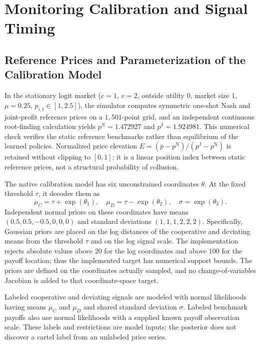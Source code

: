 \section{Monitoring Calibration and Signal Timing}

\subsection{Reference Prices and Parameterization of the Calibration Model}

In the stationary logit market ($c=1$, $v=2$, outside utility $0$, market size $1$, $\mu=0.25$, $p_{i,t}\in[1,2.5]$), the simulator computes symmetric one-shot Nash and joint-profit reference prices on a $1{,}501$-point grid, and an independent continuous root-finding calculation yields $p^{\mathrm{N}} = 1.472927$ and $p^{\mathrm{J}} = 1.924981$. This numerical check verifies the static reference benchmarks rather than equilibrium of the learned policies. Normalized price elevation $E = (\bar{p}-p^{\mathrm{N}})/(p^{\mathrm{J}}-p^{\mathrm{N}})$ is retained without clipping to $[0,1]$; it is a linear position index between static reference prices, not a structural probability of collusion.

The native calibration model has six unconstrained coordinates $\theta$. At the fixed threshold $\tau$, it decodes them as
\[
\mu_C = \tau + \exp(\theta_1), \quad \mu_D = \tau - \exp(\theta_2), \quad \sigma = \exp(\theta_3).
\]
Independent normal priors on these coordinates have means $(0.5, 0.5, -0.5, 0, 0, 0)$ and standard deviations $(1, 1, 1, 2, 2, 2)$. Specifically, Gaussian priors are placed on the log distances of the cooperative and deviating means from the threshold $\tau$ and on the log signal scale. The implementation rejects absolute values above $20$ for the log coordinates and above $100$ for the payoff location; thus the implemented target has numerical support bounds. The priors are defined on the coordinates actually sampled, and no change-of-variables Jacobian is added to that coordinate-space target.

Labeled cooperative and deviating signals are modeled with normal likelihoods having means $\mu_C$ and $\mu_D$ and shared standard deviation $\sigma$. Labeled benchmark payoffs also use normal likelihoods with a supplied known payoff observation scale. These labels and restrictions are model inputs; the posterior does not discover a cartel label from an unlabeled price series.

